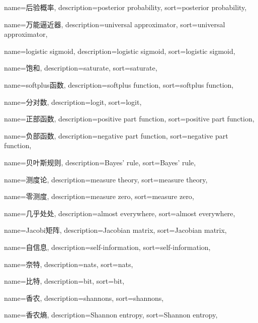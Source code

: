 {
  name=后验概率,
  description={posterior probability},
  sort={posterior probability},
}

{
  name=万能逼近器,
  description={universal approximator},
  sort={universal approximator},
}

{
  name=logistic sigmoid,
  description={logistic sigmoid},
  sort={logistic sigmoid},
}

{
  name=饱和,
  description={saturate},
  sort={saturate},
}

{
  name=softplus函数,
  description={softplus function},
  sort={softplus function},
}

{
  name=分对数,
  description={logit},
  sort={logit},
}

{
  name=正部函数,
  description={positive part function},
  sort={positive part function},
}

{
  name=负部函数,
  description={negative part function},
  sort={negative part function},
}

{
  name=贝叶斯规则,
  description={Bayes' rule},
  sort={Bayes' rule},
}

{
  name=测度论,
  description={measure theory},
  sort={measure theory},
}

{
  name=零测度,
  description={measure zero},
  sort={measure zero},
}

{
  name=几乎处处,
  description={almost everywhere},
  sort={almost everywhere},
}

{
  name=Jacobi矩阵,
  description={Jacobian matrix},
  sort={Jacobian matrix},
}

{
  name=自信息,
  description={self-information},
  sort={self-information},
}

{
  name=奈特,
  description={nats},
  sort={nats},
}

{
  name=比特,
  description={bit},
  sort={bit},
}

{
  name=香农,
  description={shannons},
  sort={shannons},
}

{
  name=香农熵,
  description={Shannon entropy},
  sort={Shannon entropy},
}

